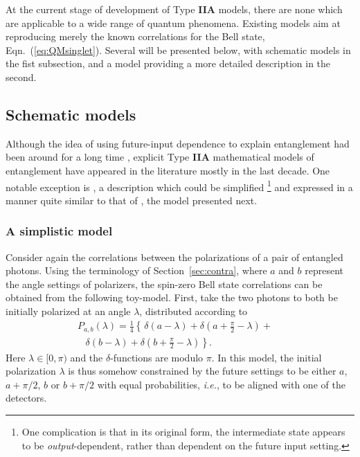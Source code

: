 \documentclass[onecolumn, nofootinbib, 12pt]{revtex4-1}
\begin{document}
At the current stage of development of Type {\bf IIA} models, there are none which are applicable to a wide range of quantum phenomena.  Existing models aim at reproducing merely the known correlations for the Bell state, Eqn.~(\ref{eq:QMsinglet}).  Several will be presented below, with schematic models in the fist subsection, and a model providing a more detailed description in the second.

\subsection{Schematic models}
\label{sec:PoP}

Although the idea of using future-input dependence to explain entanglement had been around for a long time \cite{costa1953,costa1977,costa1979, cramer1980,pegg1982,sutherland1983,price1984,price1997}, explicit Type {\bf IIA} mathematical models of entanglement have appeared in the literature mostly in the last decade.  One notable exception is \textcite{pegg1982}, a description which could be simplified%
\footnote{One complication is that in its original form, the intermediate state appears to be {\em output}-dependent, rather than dependent on the future input setting.}
and expressed in a manner quite similar to that of \textcite{argaman2010}, the model presented next.

\subsubsection{A simplistic model}

Consider again the correlations between the polarizations of a pair of entangled photons.  Using the terminology of Section~\ref{sec:contra}, where $a$ and $b$ represent the angle settings of polarizers, the spin-zero Bell state correlations can be obtained from the following toy-model.  First, take the two photons to both be initially polarized at an angle $\lambda$, distributed according to 
\begin{equation}
\label{eq:Argaman}
\begin{split}
P_{a,b}
(\lambda) = \frac{1}{4} \left\{ \frac{}{} \delta (a-\lambda) +
\delta \left(a+\frac{\pi}{2}-\lambda \right) + 
\right. \quad \\ \left. \;\;\; 
\delta(b-\lambda) + \delta \left(b+\frac{\pi}{2}-\lambda \right)  \right\}.
\end{split}
\end{equation}
Here $\lambda \in [0,\pi)$ and the $\delta$-functions are modulo $\pi$.  In this model, the initial polarization $\lambda$ is thus somehow constrained by the future settings to be either $a$, $a+\pi/2$, $b$ or $b+\pi/2$ with equal probabilities, \emph{i.e.}, to be aligned with one of the detectors.  
\end{document}
